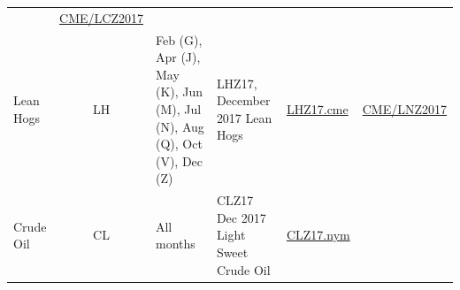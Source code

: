 \documentclass[]{book}
\theoremstyle{definition}
\theoremstyle{definition}
\theoremstyle{remark}
\begin{document}
\begin{longtable}[]{@{}lcllll@{}}
\begin{minipage}[t]{0.13\columnwidth}
\end{minipage} & \begin{minipage}[t]{0.13\columnwidth}\raggedright\strut
\href{https://www.quandl.com/data/CME/LCZ2017-Live-Cattle-Futures-December-2017-LCZ2017}{CME/LCZ2017}\strut
\end{minipage}\tabularnewline
\begin{minipage}[t]{0.07\columnwidth}\raggedright\strut
Lean Hogs\strut
\end{minipage} & \begin{minipage}[t]{0.07\columnwidth}\centering\strut
LH\strut
\end{minipage} & \begin{minipage}[t]{0.32\columnwidth}\raggedright\strut
Feb (G), Apr (J), May (K), Jun (M), Jul (N), Aug (Q), Oct (V), Dec
(Z)\strut
\end{minipage} & \begin{minipage}[t]{0.13\columnwidth}\raggedright\strut
LHZ17, December 2017 Lean Hogs\strut
\end{minipage} & \begin{minipage}[t]{0.13\columnwidth}\raggedright\strut
\href{http://finance.yahoo.com/quote/LHZ17.CME/?p=LHZ17.CME}{LHZ17.cme}\strut
\end{minipage} & \begin{minipage}[t]{0.13\columnwidth}\raggedright\strut
\href{https://www.quandl.com/data/CME/LNZ2017-Lean-Hog-Futures-December-2017-LNZ2017}{CME/LNZ2017}\strut
\end{minipage}\tabularnewline
\begin{minipage}[t]{0.07\columnwidth}\raggedright\strut
Crude Oil\strut
\end{minipage} & \begin{minipage}[t]{0.07\columnwidth}\centering\strut
CL\strut
\end{minipage} & \begin{minipage}[t]{0.32\columnwidth}\raggedright\strut
All months\strut
\end{minipage} & \begin{minipage}[t]{0.13\columnwidth}\raggedright\strut
CLZ17 Dec 2017 Light Sweet Crude Oil\strut
\end{minipage} & \begin{minipage}[t]{0.13\columnwidth}\raggedright\strut
\href{http://finance.yahoo.com/quote/CLZ17.NYM/?p=CLZ17.NYM}{CLZ17.nym}\strut
\end{minipage} & \begin{minipage}[t]{0.13\columnwidth}\raggedright\strut

\end{minipage}
\end{longtable}
\end{document}
